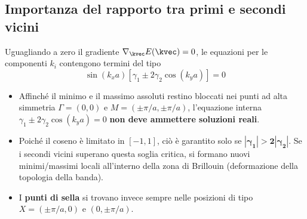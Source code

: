 \subsection{Importanza del rapporto tra primi e secondi vicini}
Uguagliando a zero il gradiente $\nabla_{\kvec}E(\kvec)=0$, le equazioni per le componenti $k_i$ contengono termini del tipo
\[ \sin(k_x a)\left[\gamma_{1} \pm 2\gamma_{2}\cos(k_y a)\right] = 0 \]
\begin{itemize}
    \setlength{\itemsep}{1pt}
    \item Affinché il minimo e il massimo assoluti restino bloccati nei punti ad alta simmetria $\Gamma=(0,0)$ e $M=(\pm\pi/a,\pm\pi/a)$, l'equazione interna $\gamma_{1}\pm2\gamma_{2}\cos(k_ya)=0$ \textbf{non deve ammettere soluzioni reali}.
    \item Poiché il coseno è limitato in $[-1,1]$, ciò è garantito solo se $\bm{|\gamma_{1}| > 2|\gamma_{2}|}$. Se i secondi vicini superano questa soglia critica, si formano nuovi minimi/massimi locali all'interno della zona di Brillouin (deformazione della topologia della banda).
    \item I \textbf{punti di sella} si trovano invece sempre nelle posizioni di tipo $X=(\pm\pi/a,0)$ e $(0,\pm\pi/a)$.
\end{itemize}

